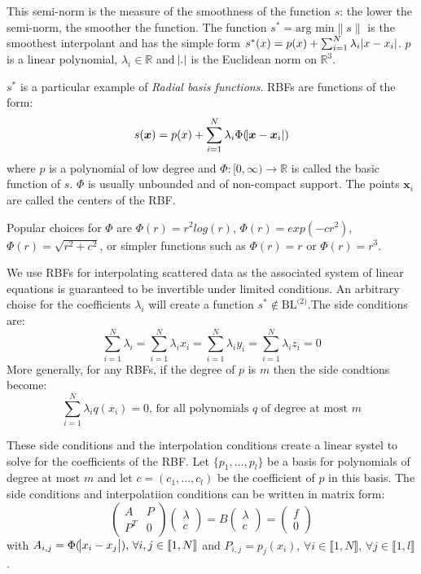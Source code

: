 \documentclass[12pt]{article}
\begin{document}
This semi-norm is the measure of the smoothness of the function $s$: the lower the semi-norm, the smoother the function. The function $s^* = \text{arg min} \|s\|$ is the smoothest interpolant and has the simple form $s^*(x) = p(x) + \sum_{i = 1}^{N}\lambda_i\abs{x - x_i}$. $p$ is a linear polynomial, $\lambda_i \in \mathbb{R}$ and $\abs{.}$ is the Euclidean norm on $\mathbb{R}^3$.

$s^*$ is a particular example of \emph{Radial basis functions}. RBFs are functions of the form:
$$s(\boldsymbol{x}) = p(x) + \sum_{i=1}^{N}\lambda_i\Phi(\abs{\boldsymbol{x} - \boldsymbol{x}_i})$$
where $p$ is a polynomial of low degree and $\Phi:[0,\infty) \to \mathbb{R}$ is called the basic function of $s$. $\Phi$ is usually unbounded and of non-compact support. The points $\boldsymbol{x}_i$ are called the centers of the RBF.

Popular choices for $\Phi$ are $\Phi(r) = r^2log(r)$, $\Phi(r) = exp(-cr^2)$, $\Phi(r) = \sqrt{r^2+c^2}$, or simpler functions such as $\Phi(r) = r$ or $\Phi(r) = r^3$.

We use RBFs for interpolating scattered data as the associated system of linear equations is guaranteed to be invertible under limited conditions. An arbitrary choise for the coefficients $\lambda_i$ will create a function $s^* \notin \text{BL}^{\text{(2)}}$.The side conditions are:
$$\sum_{i = 1}^{N}\lambda_i =  \sum_{i = 1}^{N}\lambda_i x_i = \sum_{i = 1}^{N}\lambda_i y_i =\sum_{i = 1}^{N}\lambda_i z_i = 0$$
More generally, for any RBFs, if the degree of $p$ is $m$ then the side condtions become:
$$\sum_{i = 1}^{N}\lambda_i q(x_i) = 0\text{, for all polynomials }q\text{ of degree at most }m$$

These side conditions and the interpolation conditions create a linear systel to solve for the coefficients of the RBF. Let $\{p_1, ..., p_l\}$ be a basis for polynomials of degree at most $m$ and let $c = (c_1, ..., c_l)$ be the coefficient of $p$ in this basis. The side conditions and interpolatiion conditions can be written in matrix form:
$$
\begin{pmatrix}
A & P \\
P^T & 0
\end{pmatrix}
\begin{pmatrix}
\lambda \\
c
\end{pmatrix}
= B
\begin{pmatrix}
\lambda \\
c
\end{pmatrix}
=
\begin{pmatrix}
f \\
0
\end{pmatrix}
$$
with $A_{i,j} = \Phi(\abs{x_i - x_j})\text{, }\forall i,j \in \llbracket 1, N\rrbracket$ and $P_{i,j} = p_j(x_i)\text{, }\forall i \in \llbracket 1, N\rrbracket\text{, }\forall j \in \llbracket 1, l\rrbracket$.
\end{document}
